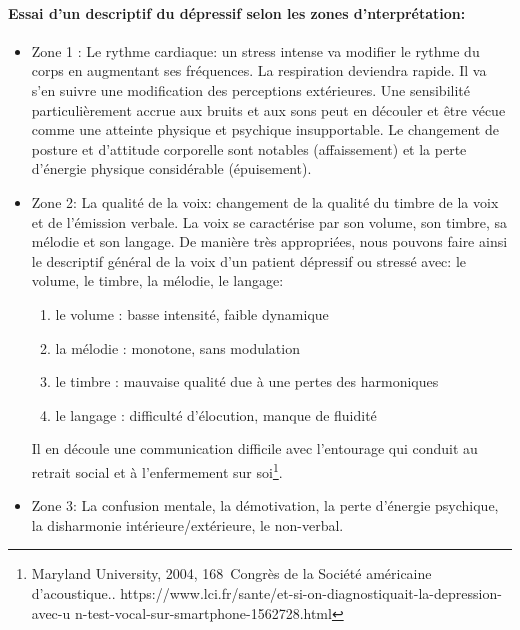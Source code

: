       \paragraph{Essai d'un descriptif du dépressif selon les zones d'nterprétation:}

\begin{itemize}
  	\item Zone 1 :  Le rythme cardiaque: un stress intense va modifier le rythme
  du corps en augmentant ses fréquences. La respiration deviendra
  rapide. Il va s'en suivre une modification des perceptions
  extérieures. Une sensibilité particulièrement accrue aux bruits et
  aux sons peut en découler et être vécue comme une
  atteinte physique et psychique insupportable.
  Le changement de posture et d'attitude corporelle sont
notables (affaissement) et la perte d'énergie physique considérable (épuisement).
	\item Zone 2: La qualité de la voix: changement de la qualité du timbre de la
 voix et de l'émission verbale.	
  La voix se caractérise par son volume, son timbre, sa mélodie et son langage. 
	De manière très appropriées, nous pouvons faire ainsi le
        descriptif général de la voix d'un patient dépressif ou
        stressé avec: le volume, le timbre, la
        mélodie, le langage: 
 	\begin{enumerate}
 		\item le volume : basse intensité, faible dynamique
 		\item la mélodie : monotone, sans modulation
 		\item le timbre : mauvaise qualité due à une pertes des harmoniques
 		\item le langage : difficulté d'élocution, manque de fluidité
 	\end{enumerate}
        Il en découle une communication difficile avec l'entourage qui  conduit au retrait social et à l'enfermement sur soi\footnote{Maryland University, 2004, 168\ieme\ Congrès de la Société
américaine d'acoustique.\autocite{le_service_metronews}. https://www.lci.fr/sante/et-si-on-diagnostiquait-la-depression-avec-u
n-test-vocal-sur-smartphone-1562728.html}.
        
	\item Zone 3: La confusion mentale, la démotivation, la perte d'énergie
psychique, la disharmonie intérieure/extérieure, le non-verbal.
\end{itemize}

